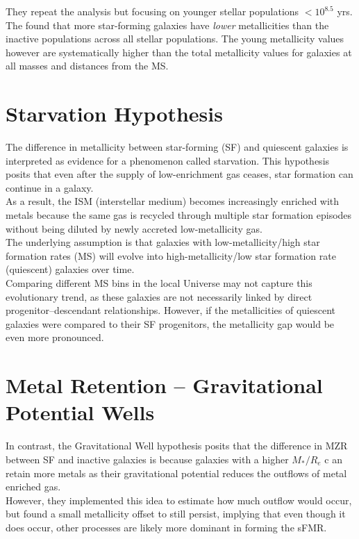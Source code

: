 \documentclass[svgnames]{article}     %
\begin{document}
They repeat the analysis but focusing on younger stellar populations
$<10^{8.5}$ yrs. The found that more star-forming galaxies have \textit{lower}
metallicities than the inactive populations across all stellar populations. The
young metallicity values however are systematically higher than the total
metallicity values for galaxies at all masses and distances from the MS.


\section{Starvation Hypothesis}

The difference in metallicity between star-forming (SF) and quiescent galaxies
is interpreted as evidence for a phenomenon called starvation. This hypothesis
posits that even after the supply of low-enrichment gas ceases, star formation
can continue in a galaxy. \\

As a result, the ISM (interstellar medium) becomes increasingly enriched with
metals because the same gas is recycled through multiple star formation
episodes without being diluted by newly accreted low-metallicity gas. \\

The underlying assumption is that galaxies with low-metallicity/high star
formation rates (MS) will evolve into high-metallicity/low star formation rate
(quiescent) galaxies over time.\\ 

Comparing different MS bins in the local Universe may not capture this
evolutionary trend, as these galaxies are not necessarily linked by direct
progenitor–descendant relationships. However, if the metallicities of quiescent
galaxies were compared to their SF progenitors, the metallicity gap would be
even more pronounced. 

\section{Metal Retention -- Gravitational Potential Wells} 

In contrast, the Gravitational Well hypothesis posits that the difference in
MZR between SF and inactive galaxies is because galaxies with a higher
$M_*/R_e$ c an retain more metals as their gravitational potential reduces the
outflows of metal enriched gas. \\

However, they implemented this idea to estimate how much outflow would occur,
but found a small metallicity offset to still persist, implying that even
though it does occur, other processes are likely more dominant in forming the
sFMR. 
\end{document}
